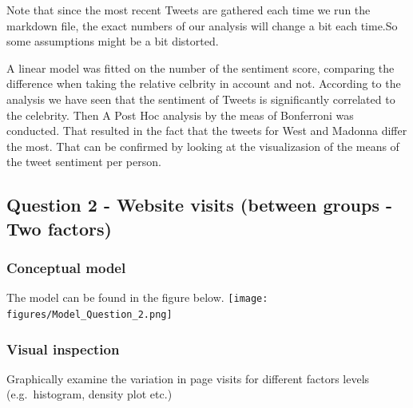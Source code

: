 \documentclass[]{article}
\begin{document}
Note that since the most recent Tweets are gathered each time we run the
markdown file, the exact numbers of our analysis will change a bit each
time.So some assumptions might be a bit distorted.

A linear model was fitted on the number of the sentiment score,
comparing the difference when taking the relative celbrity in account
and not. According to the analysis we have seen that the sentiment of
Tweets is significantly correlated to the celebrity. Then A Post Hoc
analysis by the meas of Bonferroni was conducted. That resulted in the
fact that the tweets for West and Madonna differ the most. That can be
confirmed by looking at the visualizasion of the means of the tweet
sentiment per person.

\subsection{Question 2 - Website visits (between groups - Two
factors)}\label{question-2---website-visits-between-groups---two-factors}

\subsubsection{Conceptual model}\label{conceptual-model-1}

The model can be found in the figure below.
\texttt{[image: figures/Model\_Question\_2.png]}

\subsubsection{Visual inspection}\label{visual-inspection}

Graphically examine the variation in page visits for different factors
levels (e.g.~histogram, density plot etc.)
\end{document}
